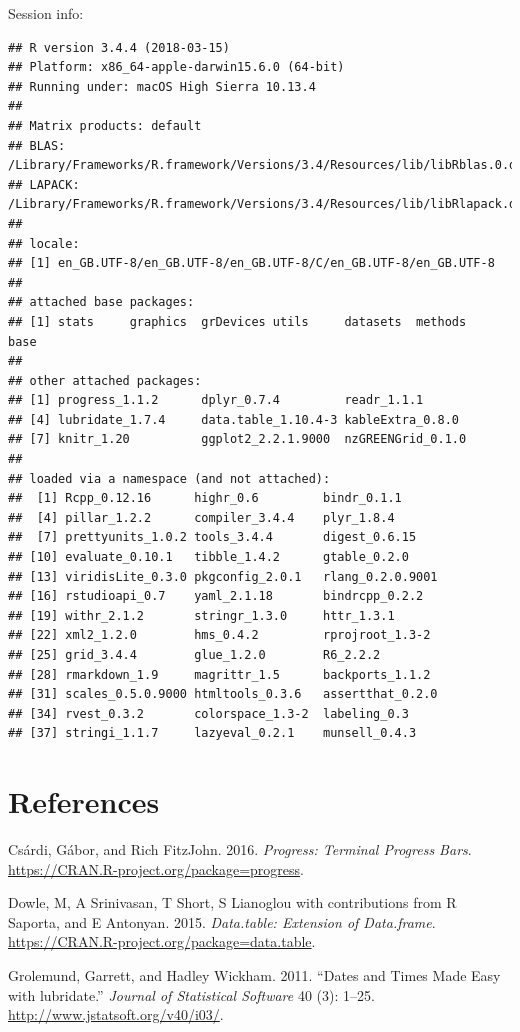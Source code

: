 \documentclass[]{article}
\begin{document}
Session info:

\begin{verbatim}
## R version 3.4.4 (2018-03-15)
## Platform: x86_64-apple-darwin15.6.0 (64-bit)
## Running under: macOS High Sierra 10.13.4
## 
## Matrix products: default
## BLAS: /Library/Frameworks/R.framework/Versions/3.4/Resources/lib/libRblas.0.dylib
## LAPACK: /Library/Frameworks/R.framework/Versions/3.4/Resources/lib/libRlapack.dylib
## 
## locale:
## [1] en_GB.UTF-8/en_GB.UTF-8/en_GB.UTF-8/C/en_GB.UTF-8/en_GB.UTF-8
## 
## attached base packages:
## [1] stats     graphics  grDevices utils     datasets  methods   base     
## 
## other attached packages:
## [1] progress_1.1.2      dplyr_0.7.4         readr_1.1.1        
## [4] lubridate_1.7.4     data.table_1.10.4-3 kableExtra_0.8.0   
## [7] knitr_1.20          ggplot2_2.2.1.9000  nzGREENGrid_0.1.0  
## 
## loaded via a namespace (and not attached):
##  [1] Rcpp_0.12.16      highr_0.6         bindr_0.1.1      
##  [4] pillar_1.2.2      compiler_3.4.4    plyr_1.8.4       
##  [7] prettyunits_1.0.2 tools_3.4.4       digest_0.6.15    
## [10] evaluate_0.10.1   tibble_1.4.2      gtable_0.2.0     
## [13] viridisLite_0.3.0 pkgconfig_2.0.1   rlang_0.2.0.9001 
## [16] rstudioapi_0.7    yaml_2.1.18       bindrcpp_0.2.2   
## [19] withr_2.1.2       stringr_1.3.0     httr_1.3.1       
## [22] xml2_1.2.0        hms_0.4.2         rprojroot_1.3-2  
## [25] grid_3.4.4        glue_1.2.0        R6_2.2.2         
## [28] rmarkdown_1.9     magrittr_1.5      backports_1.1.2  
## [31] scales_0.5.0.9000 htmltools_0.3.6   assertthat_0.2.0 
## [34] rvest_0.3.2       colorspace_1.3-2  labeling_0.3     
## [37] stringi_1.1.7     lazyeval_0.2.1    munsell_0.4.3
\end{verbatim}

\section*{References}\label{references}

\hypertarget{refs}{}
\hypertarget{ref-progress}{}
Csárdi, Gábor, and Rich FitzJohn. 2016. \emph{Progress: Terminal
Progress Bars}. \url{https://CRAN.R-project.org/package=progress}.

\hypertarget{ref-data.table}{}
Dowle, M, A Srinivasan, T Short, S Lianoglou with contributions from R
Saporta, and E Antonyan. 2015. \emph{Data.table: Extension of
Data.frame}. \url{https://CRAN.R-project.org/package=data.table}.

\hypertarget{ref-lubridate}{}
Grolemund, Garrett, and Hadley Wickham. 2011. ``Dates and Times Made
Easy with lubridate.'' \emph{Journal of Statistical Software} 40 (3):
1--25. \url{http://www.jstatsoft.org/v40/i03/}.
\end{document}

